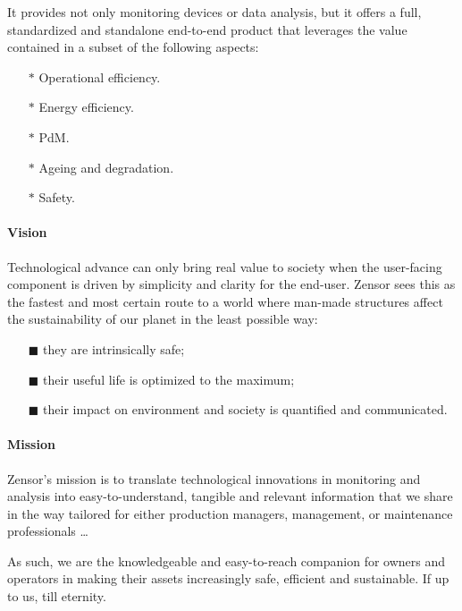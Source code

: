 It provides not only monitoring devices or data analysis, but it offers a full, standardized and standalone end-to-end product that leverages the value contained in a subset of the following aspects:
\begin{multicols}{2}
    \begin{itemize}
        \item[$\ast$] Operational efficiency.
        \item[$\ast$] Energy efficiency.
        \item[$\ast$] \acl{PdM}.
        \item[$\ast$] Ageing and degradation.
        \item[$\ast$] Safety.
    \end{itemize}
\end{multicols}

\paragraph{Vision} 
Technological advance can only bring real value to society when the user-facing component is driven by simplicity and clarity for the end-user. 
Zensor sees this as the fastest and most certain route to a world where man-made structures affect the sustainability of our planet in the least possible way:
\begin{enumerate}
    \item[$\blacksquare$] they are intrinsically safe;
    \item[$\blacksquare$] their useful life is optimized to the maximum;
    \item[$\blacksquare$] their impact on environment and society is quantified and communicated.
\end{enumerate}

\paragraph{Mission}
Zensor's mission is to translate technological innovations in monitoring and analysis into easy-to-understand, tangible and relevant information that we share in the way tailored for either production managers,
management, or maintenance professionals \dots \par
As such, we are the knowledgeable and easy-to-reach companion for owners and operators in making their assets increasingly safe, efficient and sustainable. If up to us, till eternity.